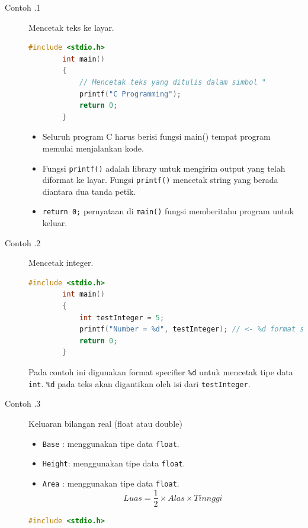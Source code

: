 \begin{description}
	\item[Contoh \thesubsection.1]  Mencetak teks ke layar.
		\begin{lstlisting}[language=c,caption = Mencetak Tulisan "C Programming" Ke layar,captionpos=t]
		#include <stdio.h>
		int main()
		{ 
			// Mencetak teks yang ditulis dalam simbol "
			printf("C Programming");
			return 0;
		}
		\end{lstlisting}

		\begin{itemize}
			\item Seluruh program C harus berisi fungsi main() tempat program memulai menjalankan kode.
			\item Fungsi \verb*|printf()| adalah library untuk mengirim output yang telah diformat ke layar.  Fungsi \verb*|printf()|  mencetak string yang berada diantara dua tanda petik.
			\item \verb*|return 0;| pernyataan di \verb*|main()| fungsi memberitahu program untuk keluar.
		\end{itemize}
	\item [Contoh \thesubsection.2] Mencetak integer.
		\begin{lstlisting}[language=c,captionpos=t]
		#include <stdio.h>
		int main()
		{
			int testInteger = 5;
			printf("Number = %d", testInteger); // <- %d format string
			return 0;
		}
	\end{lstlisting}

	    Pada contoh ini digunakan format specifier \verb*|%d| untuk mencetak tipe data \verb*|int|. \verb*|%d| pada teks akan digantikan oleh isi dari \verb*|testInteger|.

	\item[Contoh \thesubsection.3] Keluaran bilangan real (float atau double)
		\begin{itemize}
			\item \verb|Base|  : menggunakan tipe data \verb|float|.
			\item \verb|Height|: menggunakan tipe data \verb|float|.
			\item \verb|Area|  : menggunakan tipe data \verb|float|.
			      \begin{equation}\label{eq:LuasSegitiga}
				      Luas = \frac{1}{2} \times Alas \times Tinnggi
			      \end{equation}
		\end{itemize}
		\begin{lstlisting}[language=c,captionpos=t]
		#include <stdio.h>
		

\end{lstlisting}
\end{description}
